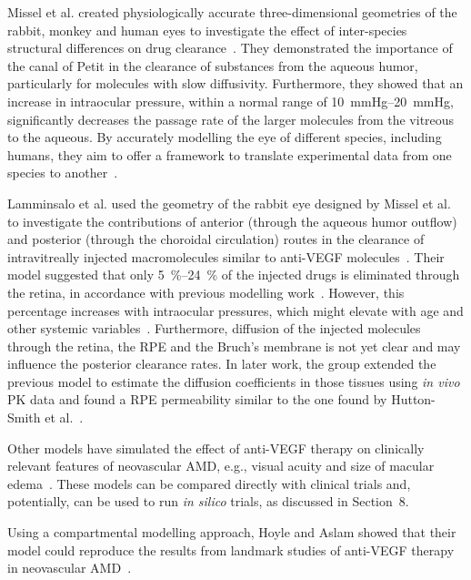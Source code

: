 \documentclass[12pt,a4paper]{journal}
\begin{document}
Missel et al. created physiologically accurate three-dimensional geometries of the rabbit, monkey and human eyes to investigate the effect of inter-species structural differences on drug clearance~\cite{Missel_2012}.  
They demonstrated the importance of the canal of Petit in the clearance of substances from the aqueous humor, particularly for molecules with slow diffusivity. 
Furthermore, they showed that an increase in intraocular pressure, within a normal range of \SIrange[range-units = single]{10}{20}{\mmHg}, significantly decreases the passage rate of the larger molecules from the vitreous to the aqueous.
By accurately modelling the eye of different species, including humans, they aim to offer a framework to translate experimental data from one species to another~\cite{Missel_2012}.

Lamminsalo et al. used the geometry of the rabbit eye designed by Missel et al. to investigate the contributions of anterior (through the aqueous humor outflow) and posterior (through the choroidal circulation) routes in the clearance of intravitreally injected macromolecules similar to anti-VEGF molecules~\cite{Lamminsalo_2018}.
Their model suggested that only \SIrange[range-units = single]{5}{24}{\percent} of the injected drugs is eliminated through the retina, in accordance with previous modelling work~\cite{HuttonSmith_2017}.
However, this percentage increases with intraocular pressures, which might elevate with age and other systemic variables~\cite{Armaly_1967,Hashemi_2005}.
Furthermore, diffusion of the injected molecules through the retina, the RPE and the Bruch's membrane is not yet clear and may influence the posterior clearance rates.
In later work, the group extended the previous model to estimate the diffusion coefficients in those tissues using \textit{in vivo} PK data and found a RPE permeability similar to the one found by Hutton-Smith et al.~\cite{Lamminsalo_2020,HuttonSmith_2017}.

Other models have simulated the effect of anti-VEGF therapy on clinically relevant features of neovascular AMD, e.g., visual acuity and size of macular edema~\cite{Edwards_2020, Hoyle_2017, Mulyukov_2018}.
These models can be compared directly with clinical trials and, potentially, can be used to run \textit{in silico} trials, as discussed in Section~8. %

Using a compartmental modelling approach, Hoyle and Aslam showed that their model could reproduce the results from landmark studies of anti-VEGF therapy in neovascular AMD~\cite{Hoyle_2017}.
\end{document}
